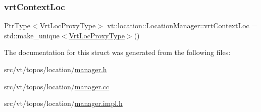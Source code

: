 \mbox{\label{structvt_1_1location_1_1_location_manager_aec12685db3f4c7c9fec6348496689174}} 
\subsubsection{\texorpdfstring{vrt\+Context\+Loc}{vrtContextLoc}}
{\footnotesize\ttfamily \hyperlink{structvt_1_1location_1_1_location_manager_a32d8bca6ed6909a2190286408335d3b4}{Ptr\+Type}$<$\hyperlink{structvt_1_1location_1_1_location_manager_a3e410c85f5790a526a4eda22a9cc7881}{Vrt\+Loc\+Proxy\+Type}$>$ vt\+::location\+::\+Location\+Manager\+::vrt\+Context\+Loc = std\+::make\+\_\+unique$<$\hyperlink{structvt_1_1location_1_1_location_manager_a3e410c85f5790a526a4eda22a9cc7881}{Vrt\+Loc\+Proxy\+Type}$>$()}



The documentation for this struct was generated from the following files\+:\begin{DoxyCompactItemize}
\item 
src/vt/topos/location/\hyperlink{topos_2location_2manager_8h}{manager.\+h}\item 
src/vt/topos/location/\hyperlink{topos_2location_2manager_8cc}{manager.\+cc}\item 
src/vt/topos/location/\hyperlink{topos_2location_2manager_8impl_8h}{manager.\+impl.\+h}\end{DoxyCompactItemize}

